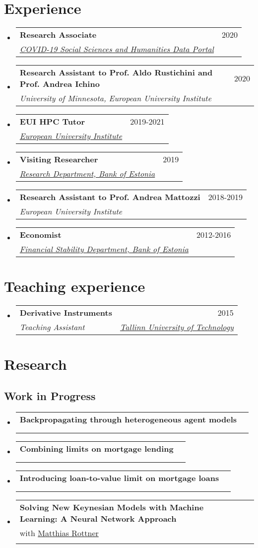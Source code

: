 \documentclass[a4, 11pt]{article}
\makeatletter
\newcommand{\resumeSubheading}[4]{
      \vspace{-2pt}\item
        \begin{tabular*}{0.97\textwidth}[t]{l@{\extracolsep{\fill}}r}
          \textbf{#1} & #2 \\
          \textit{\small#3} & \textit{\small #4} \\
        \end{tabular*}
    }
\newcommand{\resumePublicationHeading}[3]{
        \item
        \begin{tabularx}{0.97\textwidth}{X@{\extracolsep{2em}}r}
          #1 & #2 \\
          \multicolumn{2}{l}{\textit{\small#3}}
        \end{tabularx}
    }
\newcommand{\resumeSubHeadingListStart}{\begin{itemize}[leftmargin=0.15in, label={}]}
\newcommand{\resumeSubHeadingListEnd}{\end{itemize}}
\makeatother
\begin{document}
    \section{Experience}
  \resumeSubHeadingListStart
        \resumeSubheading
          {Research Associate}
          {2020}
          {\href{https://covid-19.eui.eu/client/en_GB/covid19-ssh-data/search/results?te=COVID19}{COVID-19 Social Sciences and Humanities Data Portal} }
          {}
        \resumeSubheading
          {Research Assistant to Prof. Aldo Rustichini and Prof. Andrea Ichino}
          {2020}
          {{University of Minnesota, European University Institute} }
          {}
        \resumeSubheading
          {EUI HPC Tutor}
          {2019-2021}
          {\href{https://www.eui.eu/ServicesAndAdmin/ComputingService/HeavyComputationalTasks}{European University Institute} }
          {}
        \resumeSubheading
          {Visiting Researcher}
          {2019}
          {\href{https://www.eestipank.ee/en}{Research Department, Bank of Estonia} }
          {}
        \resumeSubheading
          {Research Assistant to Prof. Andrea Mattozzi}
          {2018-2019}
          {{European University Institute} }
          {}
        \resumeSubheading
          {Economist}
          {2012-2016}
          {\href{https://www.eestipank.ee/en}{Financial Stability Department, Bank of Estonia} }
          {}
    \resumeSubHeadingListEnd

    \section{Teaching experience}
  \resumeSubHeadingListStart
        \resumeSubheading
          {{Derivative Instruments} }
          {2015}
          {Teaching Assistant}
          { \href{https://www.ttu.ee/en}{Tallinn University of Technology} }
    \resumeSubHeadingListEnd

    \pagebreak
    \section*{Research}\subsection{Work in Progress}
        \resumeSubHeadingListStart\resumePublicationHeading
{ \textbf{Backpropagating through heterogeneous agent models}\\ }
{}
{}\resumePublicationHeading
{ \textbf{Combining limits on mortgage lending}\\ }
{}
{}\resumePublicationHeading
{ \textbf{Introducing loan-to-value limit on mortgage loans}\\ }
{}
{}\resumePublicationHeading
{ \textbf{Solving New Keynesian Models with Machine Learning: A Neural Network Approach}\\ with \href{https://sites.google.com/view/matthias-rottner/home}{Matthias Rottner} }
{}
{}\resumeSubHeadingListEnd
\end{document}
